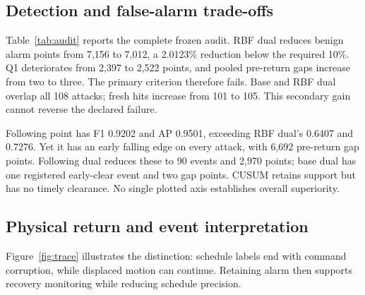 \begin{table}[t]\centering
\caption{Five-fold chronological normal validation. Lower standardized RMSE is better. Every fold uses 900 targets; the folds reuse overlapping training prefixes.}\label{tab:fivefold}
\setlength{\tabcolsep}{4pt}
\end{table}

\subsection{Detection and false-alarm trade-offs}
Table~\ref{tab:audit} reports the complete frozen audit. RBF dual reduces benign alarm points from 7,156 to 7,012, a 2.0123\% reduction below the required 10\%. Q1 deteriorates from 2,397 to 2,522 points, and pooled pre-return gaps increase from two to three. The primary criterion therefore fails. Base and RBF dual overlap all 108 attacks; fresh hits increase from 101 to 105. This secondary gain cannot reverse the declared failure.

\begin{table}[t]\centering\setlength{\tabcolsep}{4pt}
\caption{All 17 registered E5 methods on 189 synthetic episodes. Benign uses 89,100 points. Hit/fresh means overlap/fresh-onset events out of 108; early is the registered continuity-based count. Inactive means inactive by return + 5 s/detected events with return, including alarms already inactive at return. AP evaluates continuous entry scores, not retained alarm state.}\label{tab:audit}

\end{table}

Following point has F1 0.9202 and AP 0.9501, exceeding RBF dual's 0.6407 and 0.7276. Yet it has an early falling edge on every attack, with 6,692 pre-return gap points. Following dual reduces these to 90 events and 2,970 points; base dual has one registered early-clear event and two gap points. CUSUM retains support but has no timely clearance. No single plotted axis establishes overall superiority.



\subsection{Physical return and event interpretation}
Figure~\ref{fig:trace} illustrates the distinction: schedule labels end with command corruption, while displaced motion can continue. Retaining alarm then supports recovery monitoring while reducing schedule precision.

